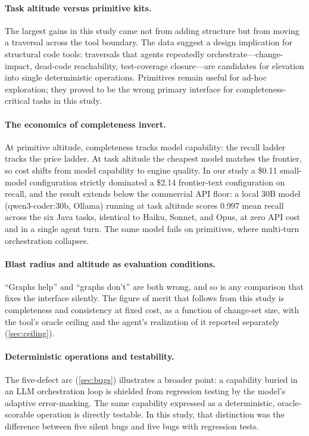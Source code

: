 \documentclass[11pt]{article}
\begin{document}
\paragraph{Task altitude versus primitive kits.} The largest gains in this
study came not from adding structure but from moving a traversal across the tool
boundary. The data suggest a design implication for structural code tools:
traversals that agents repeatedly orchestrate---change-impact, dead-code
reachability, test-coverage closure---are candidates for elevation into single
deterministic operations. Primitives remain useful for ad-hoc exploration; they
proved to be the wrong primary interface for completeness-critical tasks in this
study.

\paragraph{The economics of completeness invert.} At primitive altitude,
completeness tracks model capability: the recall ladder tracks the price ladder.
At task altitude the cheapest model matches the frontier, so cost shifts from
model capability to engine quality. In our study a \$0.11 small-model
configuration strictly dominated a \$2.14 frontier-text configuration on recall,
and the result extends below the commercial API floor: a local 30B model
(qwen3-coder:30b, Ollama) running at task altitude scores 0.997 mean recall
across the six Java tasks, identical to Haiku, Sonnet, and Opus, at zero API
cost and in a single agent turn. The same model fails on primitives, where
multi-turn orchestration collapses.

\paragraph{Blast radius and altitude as evaluation conditions.}
``Graphs help'' and ``graphs don't'' are both wrong, and so is any comparison
that fixes the interface silently. The figure of merit that follows from this
study is completeness and consistency at fixed cost, as a function of change-set
size, with the tool's oracle ceiling and the agent's realization of it reported
separately (\cref{sec:ceiling}).

\paragraph{Deterministic operations and testability.} The five-defect arc
(\cref{sec:bugs}) illustrates a broader point: a capability buried in an LLM
orchestration loop is shielded from regression testing by the model's adaptive
error-masking. The same capability expressed as a deterministic, oracle-scorable
operation is directly testable. In this study, that distinction was the
difference between five silent bugs and five bugs with regression tests.
\end{document}
